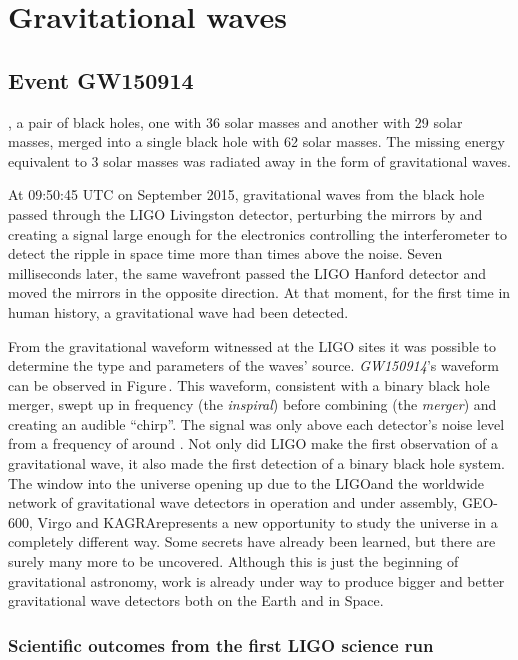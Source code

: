 \chapter{\label{c:gw-detection}Gravitational waves}

\section{Event GW150914}
, a pair of black holes, one with 36 solar masses and another with 29 solar masses, merged into a single black hole with 62 solar masses. The missing energy equivalent to 3 solar masses was radiated away in the form of gravitational waves.

At 09:50:45 \gls{UTC} on  September 2015, gravitational waves from the black hole passed through the LIGO Livingston detector, perturbing the mirrors by  and creating a signal large enough for the electronics controlling the interferometer to detect the ripple in space time more than  times above the noise. Seven milliseconds later, the same wavefront passed the LIGO Hanford detector and moved the mirrors in the opposite direction. At that moment, for the first time in human history, a gravitational wave had been detected.

From the gravitational waveform witnessed at the LIGO sites it was possible to determine the type and parameters of the waves' source. \emph{GW150914}'s waveform can be observed in Figure\,. This waveform, consistent with a binary black hole merger, swept up in frequency (the \emph{inspiral}) before combining (the \emph{merger}) and creating an audible ``chirp''. The signal was only above each detector's noise level from a frequency of around . Not only did LIGO make the first observation of a gravitational wave, it also made the first detection of a binary black hole system. The window into the universe opening up due to the LIGO\textemdash and the worldwide network of gravitational wave detectors in operation and under assembly, GEO-600, Virgo and KAGRA\textemdash represents a new opportunity to study the universe in a completely different way. Some secrets have already been learned, but there are surely many more to be uncovered. Although this is just the beginning of gravitational astronomy, work is already under way to produce bigger and better gravitational wave detectors both on the Earth and in Space.

\subsection{Scientific outcomes from the first LIGO science run}

